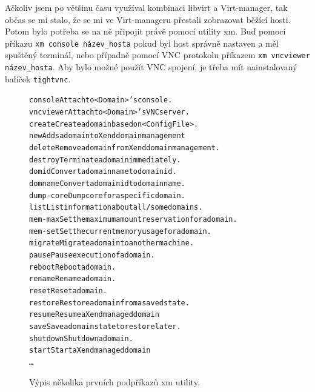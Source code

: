 Ačkoliv jsem po většinu času využíval kombinaci libvirt a Virt-manager, tak občas se mi stalo, že se mi ve Virt-manageru přestali zobrazovat běžící hosti. Potom bylo potřeba se na ně připojit právě pomocí utility xm. Buď pomocí příkazu \verb!xm console název_hosta! pokud byl host správně nastaven a měl spuštěný terminál, nebo případně pomocí VNC protokolu příkazem \verb!xm vncviewer název_hosta!. Aby bylo možné použít VNC spojení, je třeba mít nainstalovaný balíček \texttt{tightvnc}.
\begin{figure}[h!]
  \centering
\begin{alltt}
    console              Attach to <Domain>'s console.                     
    vncviewer            Attach to <Domain>'s VNC server.                  
    create               Create a domain based on <ConfigFile>.            
    new                  Adds a domain to Xend domain management           
    delete               Remove a domain from Xend domain management.      
    destroy              Terminate a domain immediately.                   
    domid                Convert a domain name to domain id.               
    domname              Convert a domain id to domain name.               
    dump-core            Dump core for a specific domain.                  
    list                 List information about all/some domains.          
    mem-max              Set the maximum amount reservation for a domain.  
    mem-set              Set the current memory usage for a domain.        
    migrate              Migrate a domain to another machine.              
    pause                Pause execution of a domain.                      
    reboot               Reboot a domain.                                  
    rename               Rename a domain.                                  
    reset                Reset a domain.                                   
    restore              Restore a domain from a saved state.              
    resume               Resume a Xend managed domain                      
    save                 Save a domain state to restore later.             
    shutdown             Shutdown a domain.                                
    start                Start a Xend managed domain
    \dots
\end{alltt}
\caption{Výpis několika prvních podpříkazů xm utility.}
  \label{fig:xm}
\end{figure}
